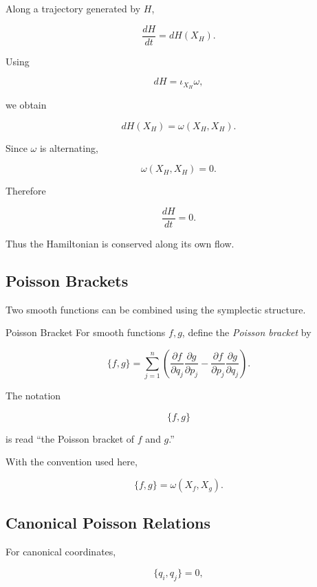 Along a trajectory generated by \(H\),

\[
\frac{dH}{dt}
=
dH(X_H).
\]

Using

\[
dH=\iota_{X_H}\omega,
\]

we obtain

\[
dH(X_H)
=
\omega(X_H,X_H).
\]

Since \(\omega\) is alternating,

\[
\omega(X_H,X_H)=0.
\]

Therefore

\[
\boxed{
\frac{dH}{dt}=0.
}
\]

Thus the Hamiltonian is conserved along its own flow.

\subsection{Poisson Brackets}
\label{subsec:poisson-brackets}

Two smooth functions can be combined using the symplectic structure.

\begin{definitionbox}{Poisson Bracket}
For smooth functions \(f,g\), define the \emph{Poisson bracket} by

\[
\boxed{
\{f,g\}
=
\sum_{j=1}^{n}
\left(
\frac{\partial f}{\partial q_j}
\frac{\partial g}{\partial p_j}
-
\frac{\partial f}{\partial p_j}
\frac{\partial g}{\partial q_j}
\right).
}
\]
\end{definitionbox}

The notation

\[
\{f,g\}
\]

is read ``the Poisson bracket of \(f\) and \(g\).''

With the convention used here,

\[
\boxed{
\{f,g\}
=
\omega(X_f,X_g).
}
\]

\subsection{Canonical Poisson Relations}
\label{subsec:canonical-poisson-relations}

For canonical coordinates,

\[
\boxed{
\{q_i,q_j\}=0,
}
\]


